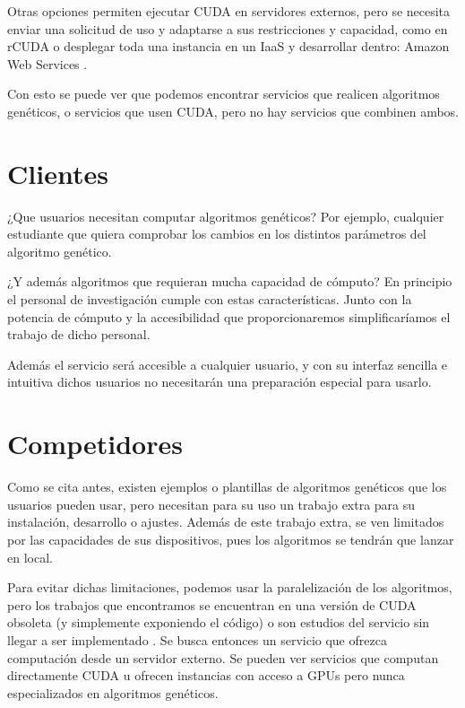 \bigskip
Otras opciones permiten ejecutar CUDA en servidores externos, pero se necesita enviar una solicitud de uso y adaptarse a sus restricciones y capacidad, como en rCUDA \cite{rcuda}
o desplegar toda una instancia en un IaaS y desarrollar dentro: Amazon Web Services \cite{amazoncuda}.

\bigskip
Con esto se puede ver que podemos encontrar servicios que realicen algoritmos genéticos, o servicios que usen CUDA, pero no hay servicios que combinen ambos.


\bigskip
\section{Clientes}
\bigskip

¿Que usuarios necesitan computar algoritmos genéticos?
Por ejemplo, cualquier estudiante que quiera comprobar los cambios en los distintos parámetros del algoritmo genético.

¿Y además algoritmos que requieran mucha capacidad de cómputo? En principio el personal de investigación cumple con estas características. Junto con la potencia de cómputo y la accesibilidad que proporcionaremos simplificaríamos el trabajo de dicho personal. 

Además el servicio será accesible a cualquier usuario, y con su interfaz sencilla e intuitiva dichos usuarios no necesitarán una preparación especial para usarlo. 

\bigskip
\section{Competidores}
\bigskip

Como se cita antes, existen ejemplos o plantillas de algoritmos genéticos \cite{agpython} \cite{agjava} \cite{agmatlab} que los usuarios pueden usar, pero necesitan para su uso un trabajo extra para su instalación, desarrollo o ajustes. Además de este trabajo extra, se ven limitados por las capacidades de sus dispositivos, pues los algoritmos se tendrán que lanzar en local.

Para evitar dichas limitaciones, podemos usar la paralelización de los algoritmos, pero los trabajos que encontramos se encuentran en una versión de CUDA obsoleta \cite{paralelizacioncuda} (y simplemente exponiendo el código) o son estudios del servicio sin llegar a ser implementado \cite{optimizacionparalelizacioncuda}. Se busca entonces un servicio que ofrezca computación desde un servidor externo. Se pueden ver servicios que computan directamente CUDA \cite{rcuda} u ofrecen instancias con acceso a GPUs \cite{amazoncuda}  pero nunca especializados en algoritmos genéticos.


